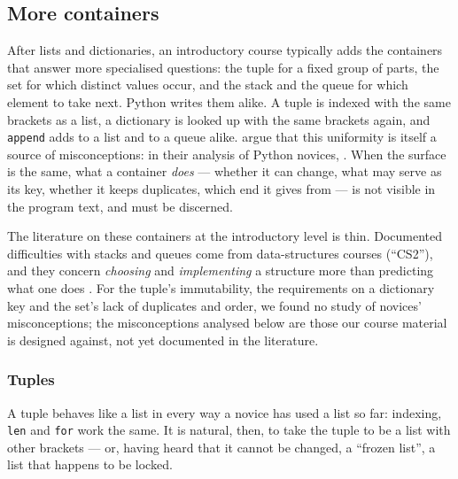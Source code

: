 \mode*
\subsection{More containers}
\label{containers}

After lists and dictionaries, an introductory course typically adds the
containers that answer more specialised questions: the tuple for a fixed
group of parts, the set for which distinct values occur, and the stack and the
queue for which element to take next.
Python writes them alike.
A tuple is indexed with the same brackets as a list, a dictionary is looked up
with the same brackets again, and \texttt{append} adds to a list
and to a queue alike.
\textcite{Johnson2020PythonMisconceptions} argue that this uniformity is itself
a source of misconceptions: in their analysis of Python novices,
.
When the surface is the same, what a container \emph{does} --- whether it can
change, what may serve as its key, whether it keeps duplicates, which end it
gives from --- is not visible in the program text, and must be discerned.

The literature on these containers at the introductory level is thin.
Documented difficulties with stacks and queues come from data-structures
courses (\enquote{CS2}), and they concern \emph{choosing} and
\emph{implementing} a structure more than predicting what one does
\autocite{Zingaro2018DataStructures}.
For the tuple's immutability, the requirements on a dictionary key and the
set's lack of duplicates and order, we found no study of novices'
misconceptions; the misconceptions analysed below are those our course
material is designed against, not yet documented in the literature.

\subsubsection{Tuples}

A tuple behaves like a list in every way a novice has used a list so far:
indexing, \texttt{len} and \texttt{for} work the same.
It is natural, then, to take the tuple to be a list with other brackets ---
or, having heard that it cannot be changed, a \enquote{frozen list}, a list
that happens to be locked.

